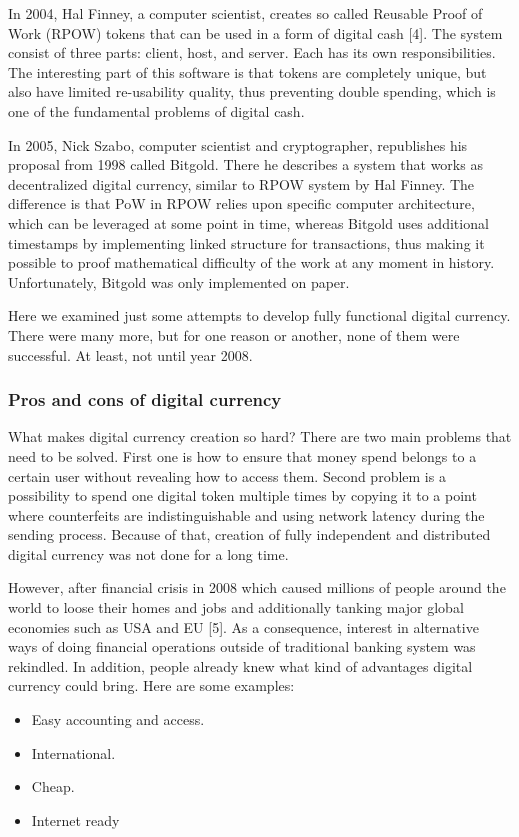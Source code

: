 \documentclass[conference,compsoc]{IEEEtran}
\begin{document}
In 2004, Hal Finney, a computer scientist, creates so called Reusable Proof of Work (RPOW) tokens that can be used in a form of digital cash [4]. 
The system consist of three parts: client, host, and server. Each has its own responsibilities. 
The interesting part of this software is that tokens are completely unique, but also have limited re-usability quality, thus preventing double spending, which is one of the fundamental problems of digital cash. 

In 2005, Nick Szabo, computer scientist and cryptographer, republishes his proposal from 1998 called Bitgold. 
There he describes a system that works as decentralized digital currency, similar to RPOW system by Hal Finney. 
The difference is that PoW in RPOW relies upon specific computer architecture, which can be leveraged at some point in time, whereas Bitgold uses additional timestamps by implementing linked structure for transactions, thus making it possible to proof mathematical difficulty of the work at any moment in history. 
Unfortunately, Bitgold was only implemented on paper.

Here we examined just some attempts to develop fully functional digital currency. 
There were many more, but for one reason or another, none of them were successful. 
At least, not until year 2008. 

\subsubsection{Pros and cons of digital currency}
What makes digital currency creation so hard? There are two main problems that need to be solved. 
First one is how to ensure that money spend belongs to a certain user without revealing how to access them. 
Second problem is a possibility to spend one digital token multiple times by copying it to a point where counterfeits are indistinguishable and using network latency during the sending process. 
Because of that, creation of fully independent and distributed digital currency was not done for a long time. 

However, after financial crisis in 2008 which caused millions of people around the world to loose their homes and jobs and additionally tanking major global economies such as USA and EU [5].
As a consequence, interest in alternative ways of doing financial operations outside of traditional banking system was rekindled. 
In addition, people already knew what kind of advantages digital currency could bring. Here are some examples:
\begin{itemize}
  \item Easy accounting and access. 
  \item International. 
  \item Cheap. 
  \item Internet ready
\end{itemize}
\end{document}
